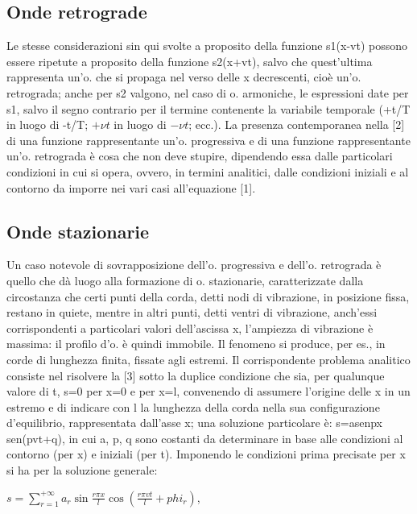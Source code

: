 \documentclass[a4paper]{article}
\begin{document}
\subsection{Onde retrograde}
Le stesse considerazioni sin qui svolte a proposito della funzione s1(x-vt) possono essere ripetute a proposito della funzione s2(x+vt), salvo che quest’ultima rappresenta un’o. che si propaga nel verso delle x decrescenti, cioè un’o. retrograda; anche per s2 valgono, nel caso di o. armoniche, le espressioni date per s1, salvo il segno contrario per il termine contenente la variabile temporale (+t/T in luogo di -t/T; $+\nu t$ in luogo di $-\nu t$; ecc.). La presenza contemporanea nella [2] di una funzione rappresentante un’o. progressiva e di una funzione rappresentante un’o. retrograda è cosa che non deve stupire, dipendendo essa dalle particolari condizioni in cui si opera, ovvero, in termini analitici, dalle condizioni iniziali e al contorno da imporre nei vari casi all’equazione [1]. 

\subsection{Onde stazionarie}
Un caso notevole di sovrapposizione dell’o. progressiva e dell’o. retrograda è quello che dà luogo alla formazione di o. stazionarie, caratterizzate dalla circostanza che certi punti della corda, detti nodi di vibrazione, in posizione fissa, restano in quiete, mentre in altri punti, detti ventri di vibrazione, anch’essi corrispondenti a particolari valori dell’ascissa x, l’ampiezza di vibrazione è massima: il profilo d’o. è quindi immobile. Il fenomeno si produce, per es., in corde di lunghezza finita, fissate agli estremi. Il corrispondente problema analitico consiste nel risolvere la [3] sotto la duplice condizione che sia, per qualunque valore di t, s=0 per x=0 e per x=l, convenendo di assumere l’origine delle x in un estremo e di indicare con l la lunghezza della corda nella sua configurazione d’equilibrio, rappresentata dall’asse x; una soluzione particolare è: s=asenpx sen(pvt+q), in cui a, p, q sono costanti da determinare in base alle condizioni al contorno (per x) e iniziali (per t). Imponendo le condizioni prima precisate per x si ha per la soluzione generale: 

$s=\sum_{r=1}^{+\infty}a_r\sin\frac{r\pi x}{l}\cos(\frac{r\pi vt}{l}+phi_r)$,
\end{document}
